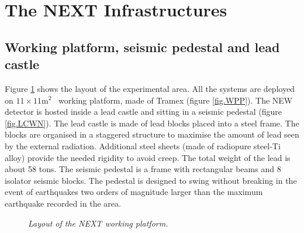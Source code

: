 \section{The NEXT Infrastructures}
\label{sec.infra}

\subsection{Working platform, seismic pedestal and lead castle}

Figure \ref{fig.WP} shows the layout of the experimental area. All the systems are deployed on  $11 \times 11 \mathrm{m^2}$~ working platform, made of Tramex (figure \ref{fig.WPP}). The NEW detector is hosted inside a lead castle and sitting in a seismic pedestal (figure \ref{fig.LCWN}). The lead castle is made of lead blocks placed into a steel frame. The blocks are organised in a staggered structure to maximise the amount of lead seen by the external radiation. Additional steel sheets (made of radiopure steel-Ti alloy) provide the needed rigidity to avoid creep. The total weight of the lead is about 58 tons. 
The seismic pedestal is a frame with rectangular beams and 8 isolator seismic blocks. The pedestal is designed to swing without breaking in the event of earthquakes two orders of magnitude larger than the maximum earthquake recorded in the area. 


\begin{figure}[hpt!]
    \bigskip
    \begin{center}\leavevmode
        \caption{\textit{Layout of the NEXT working platform.}}
        \label{fig.WP}
    \end{center}
\end{figure}

